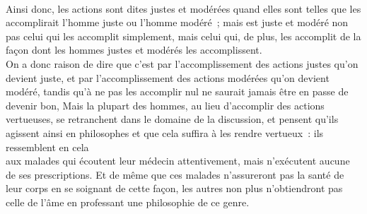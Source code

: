 \documentclass[french,twoside]{book} %
\begin{document}
\\
Ainsi donc, les actions sont dites justes et modérées quand elles sont telles que les accomplirait l’homme juste ou l’homme modéré ; mais est juste et modéré non pas celui qui les accomplit simplement, mais celui qui, de plus, les accomplit de la façon dont les hommes justes et modérés les accomplissent. \\
On a donc raison de dire que c’est par l’accomplissement des actions justes qu’on devient juste, et par l’accomplissement des actions modérées qu’on devient modéré, tandis qu’à ne pas les accomplir nul ne saurait jamais être en passe de devenir bon, Mais la plupart des hommes, au lieu d’accomplir des actions vertueuses, se retranchent dans le domaine de la discussion, et pensent qu’ils agissent ainsi en philosophes et que cela suffira à les rendre vertueux : ils ressemblent en cela \\
aux malades qui écoutent leur médecin attentivement, mais n’exécutent aucune de ses prescriptions. Et de même que ces malades n’assureront pas la santé de leur corps en se soignant de cette façon, les autres non plus n’obtiendront pas celle de l’âme en professant une philosophie de ce genre.
\end{document}
